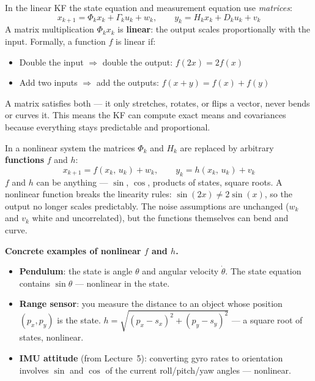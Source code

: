 \documentclass[12pt, a4paper]{article}
\begin{document}
In the linear KF the state equation and measurement equation use
\emph{matrices}:
\[
  x_{k+1} = \Phi_k x_k + \Gamma_k u_k + w_k, \qquad
  y_k     = H_k x_k + D_k u_k + v_k
\]
A matrix multiplication $\Phi_k x_k$ is \textbf{linear}: the output
scales proportionally with the input.
Formally, a function $f$ is linear if:
\begin{itemize}[leftmargin=1.4em, topsep=2pt]
  \item Double the input $\Rightarrow$ double the output:
        $f(2x) = 2f(x)$
  \item Add two inputs $\Rightarrow$ add the outputs:
        $f(x+y) = f(x) + f(y)$
\end{itemize}
A matrix satisfies both --- it only stretches, rotates, or flips a
vector, never bends or curves it.
This means the KF can compute exact means and covariances because
everything stays predictable and proportional.

In a nonlinear system the matrices $\Phi_k$ and $H_k$ are replaced
by arbitrary \textbf{functions} $f$ and $h$:
\[
  x_{k+1} = f(x_k,\, u_k) + w_k, \qquad
  y_k     = h(x_k,\, u_k) + v_k
\]
$f$ and $h$ can be anything --- $\sin$, $\cos$, products of states,
square roots.
A nonlinear function breaks the linearity rules:
$\sin(2x) \neq 2\sin(x)$, so the output no longer scales
predictably.
The noise assumptions are unchanged ($w_k$ and $v_k$ white and
uncorrelated), but the functions themselves can bend and curve.

\begin{notebox}
  \textbf{Concrete examples of nonlinear $f$ and $h$.}
  \begin{itemize}[leftmargin=1.4em, topsep=2pt]
    \item \textbf{Pendulum}: the state is angle $\theta$ and angular
          velocity $\dot\theta$.
          The state equation contains $\sin\theta$ ---
          nonlinear in the state.
    \item \textbf{Range sensor}: you measure the distance to an
          object whose position $(p_x, p_y)$ is the state.
          $h = \sqrt{(p_x - s_x)^2 + (p_y - s_y)^2}$ --- a square
          root of states, nonlinear.
    \item \textbf{IMU attitude} (from Lecture~5): converting gyro
          rates to orientation involves $\sin$ and $\cos$ of the
          current roll/pitch/yaw angles --- nonlinear.
  \end{itemize}
\end{notebox}

\end{document}
